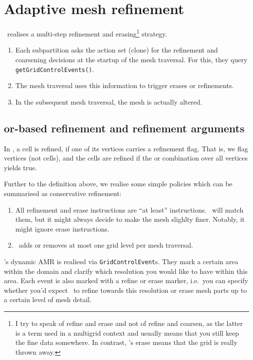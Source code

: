 \chapter{Adaptive mesh refinement}
\label{section:amr}

\Peano\ realises a multi-step refinement and erasing\footnote{I try to speak of
refine and erase and not of refine and coarsen, as the latter is a term used in
a multigrid context and usually means that you still keep the fine data
somewhere. In contrast, \Peano's erase means that the grid is really thrown
away.} strategy.

\begin{enumerate}
  \item Each subpartition asks the action set (clone) for the refinement and
  coarsening decisions at the startup of the mesh traversal. For this, they
  query \texttt{getGridControlEvents()}.
  \item The mesh traversal uses this information to trigger erases or
  refinements.
  \item In the subsequent mesh traversal, the mesh is actually altered.
\end{enumerate}


\section{or-based refinement and refinement arguments}

\begin{definition}
  In \Peano, a cell is refined, if one of its vertices carries a refinement
  flag.
  That is, we flag vertices (not cells), and the cells are refined if the or
  combination over all vertices yields true.
\end{definition}

\noindent
Further to the definition above, we realise some simple policies which can be
summarised as conservative refinement:

\begin{enumerate}
  \item All refinement and erase instructions are ``at least'' instructions.
  \Peano\ will match them, but it might always decide to make the mesh slighlty
  finer. Notably, it might ignore erase instructions.
  \item \Peano\ adds or removes at most one grid level per mesh traversal.
\end{enumerate}

\noindent
\Peano's dynamic AMR is realiesd via \texttt{GridControlEvent}s.
They mark a certain area within the domain and clarify which resolution you
would like to have within this area.
Each event is also marked with a refine or erase marker, i.e.~you can specify
whether you'd expect \Peano\ to refine towards this resolution or erase mesh
parts up to a certain level of mesh detail.


